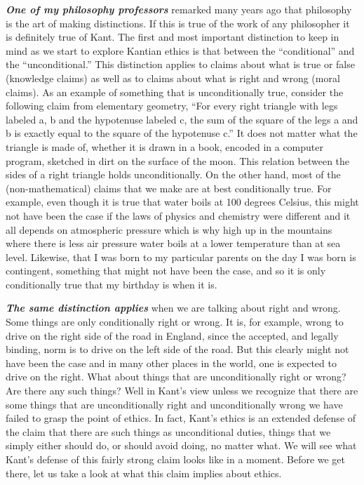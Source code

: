 \documentclass[12pt, openany]{book}
\begin{document}
\textbf{\emph{One of my philosophy professors}} remarked many years ago that philosophy is the art of making distinctions. If this is true of the work of any philosopher it is definitely true of Kant. The first and most important distinction to keep in mind as we start to explore Kantian ethics is that between the ``conditional'' and the ``unconditional.'' This distinction applies to claims about what is true or false (knowledge claims) as well as to claims about what is right and wrong (moral claims). As an example of something that is unconditionally true, consider the following claim from elementary geometry, ``For every right triangle with legs labeled a, b and the hypotenuse labeled c, the sum of the square of the legs a and b is exactly equal to the square of the hypotenuse c.'' It does not matter what the triangle is made of, whether it is drawn in a book, encoded in a computer program, sketched in dirt on the surface of the moon. This relation between the sides of a right triangle holds unconditionally. On the other hand, most of the (non-mathematical) claims that we make are at best conditionally true. For example, even though it is true that water boils at 100 degrees Celsius, this might not have been the case if the laws of physics and chemistry were different and it all depends on atmospheric pressure which is why high up in the mountains where there is less air pressure water boils at a lower temperature than at sea level. Likewise, that I was born to my particular parents on the day I was born is contingent, something that might not have been the case, and so it is only conditionally true that my birthday is when it is.

\textbf{\emph{The same distinction applies}} when we are talking about right and wrong. Some things are only conditionally right or wrong. It is, for example, wrong to drive on the right side of the road in England, since the accepted, and legally binding, norm is to drive on the left side of the road. But this clearly might not have been the case and in many other places in the world, one is expected to drive on the right. What about things that are unconditionally right or wrong? Are there any such things? Well in Kant's view unless we recognize that there are some things that are unconditionally right and unconditionally wrong we have failed to grasp the point of ethics. In fact, Kant's ethics is an extended defense of the claim that there are such things as unconditional duties, things that we simply either should do, or should avoid doing, no matter what. We will see what Kant's defense of this fairly strong claim looks like in a moment. Before we get there, let us take a look at what this claim implies about ethics.
\end{document}
